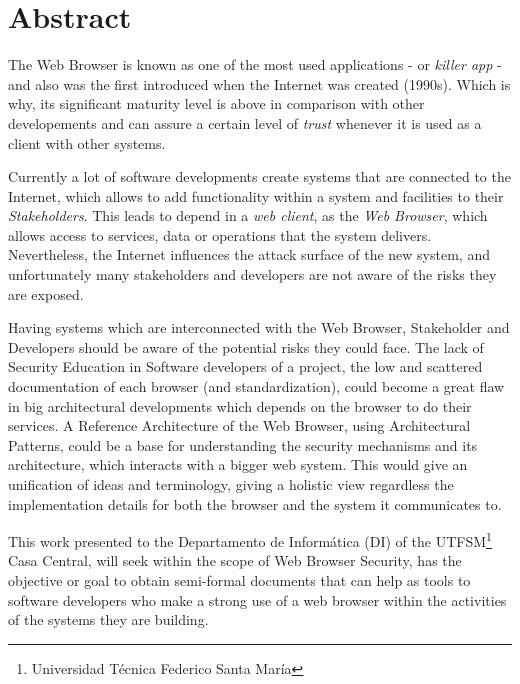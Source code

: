 \section*{Abstract}
\label{chap:abstract}

The Web Browser is known as one of the most used applications - or \textit{killer app} - and also was the first introduced when the Internet was created (1990s). Which is why, its significant maturity level is above in comparison with other developements and can assure a certain level of \textit{trust} whenever it is used as a client with other systems.

Currently a lot of software developments create systems that are connected to the Internet, which allows to add functionality within a system and facilities to their \textit{Stakeholders}. This leads to depend in a \textit{web client}, as the \textit{Web Browser}, which allows access to services, data or operations that the system delivers. Nevertheless, the Internet influences the attack surface of the new system, and unfortunately many stakeholders and developers are not aware of the risks they are exposed.

Having systems which are interconnected with the Web Browser, Stakeholder and Developers should be aware of the potential risks they could face. The lack of Security Education in Software developers of a project, the low and scattered documentation of each browser (and standardization), could become a great flaw in big architectural developments which depends on the browser to do their services. A Reference Architecture of the Web Browser, using Architectural Patterns, could be a base for understanding the security mechanisms and its architecture, which interacts with a bigger web system. This would give an unification of ideas and terminology, giving a holistic view regardless the implementation details for both the browser and the system it communicates to.

This work presented to the Departamento de Informática (DI) of the UTFSM\footnote{Universidad Técnica Federico Santa María} Casa Central, will seek within the scope of Web Browser Security, has the objective or goal to obtain semi-formal documents that can help as tools to software developers who make a strong use of a web browser within the activities of the systems they are building.




